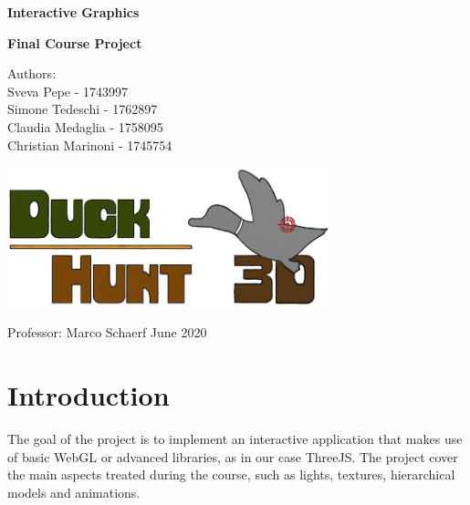 \documentclass[12pt,a4paper]{article}
\begin{document}
	
	\begin{titlepage}
		\begin{center}
			\vspace*{1cm}
			
			\LARGE
			\textbf{Interactive Graphics}
			
			\large 
			\textbf{Final Course Project}
			
			\vspace{1.5cm}
			Authors: \\
			Sveva Pepe - 1743997 \\ 
			Simone Tedeschi - 1762897 \\
			Claudia Medaglia - 1758095 \\
			Christian Marinoni - 1745754
			\vfill
			
			\includegraphics[width=0.7\textwidth]{logo}
			
			\vfill
			
			\large
			Professor: Marco Schaerf\break\break\break\break
			June 2020
			
		\end{center}
	\end{titlepage}
	
	\tableofcontents
	\pagebreak
	\section{Introduction}
	The goal of the project is to implement an interactive application 
	that makes use of basic WebGL or advanced libraries, as in our case ThreeJS. The project 
	cover the main aspects treated during the course, such as lights, textures, hierarchical models and animations.
\end{document}
